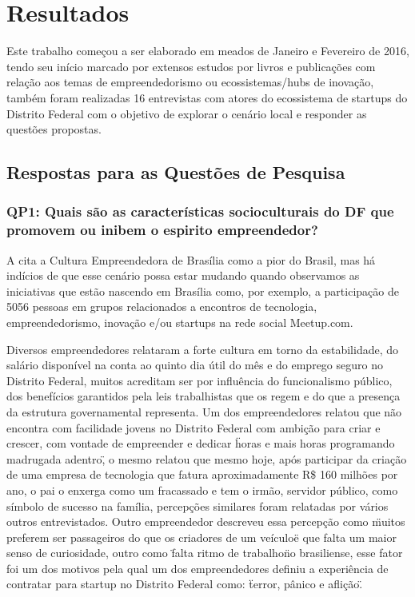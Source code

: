 \chapter[Resultados]{Resultados}
\label{cap-resultados}

Este trabalho começou a ser elaborado em meados de Janeiro e Fevereiro de 2016, tendo seu início marcado por extensos estudos por livros e publicações com relação aos temas de empreendedorismo ou ecossistemas/hubs de inovação, também foram realizadas 16 entrevistas com atores do ecossistema de startups do Distrito Federal com o objetivo de explorar o cenário local e responder as questões propostas.

\section{Respostas para as Questões de Pesquisa}
\label{section:perguntas_de_pesquisa}

\subsection{QP1: Quais são as características socioculturais do DF que promovem ou inibem o espirito empreendedor?}
\label{subsection:pergunta_de_pesquisa_1}

A  cita a Cultura Empreendedora de Brasília como a pior do Brasil, mas há indícios de que esse cenário possa estar mudando quando observamos as iniciativas que estão nascendo em Brasília como, por exemplo, a participação de 5056 pessoas em grupos relacionados a encontros de tecnologia, empreendedorismo, inovação e/ou startups na rede social Meetup.com.

Diversos empreendedores relataram a forte cultura em torno da estabilidade, do salário disponível na conta ao quinto dia útil do mês e do emprego seguro no Distrito Federal, muitos acreditam ser por influência do funcionalismo público, dos benefícios garantidos pela leis trabalhistas que os regem e do que a presença da estrutura governamental representa. Um dos empreendedores relatou que não encontra com facilidade jovens no Distrito Federal com ambição para criar e crescer, com vontade de empreender e dedicar \"horas e mais horas programando madrugada adentro\", o mesmo relatou que mesmo hoje, após participar da criação de uma empresa de tecnologia que fatura aproximadamente R\$ 160 milhões por ano, o pai o enxerga como um fracassado e tem o irmão, servidor público, como símbolo de sucesso na família, percepções similares foram relatadas por vários outros entrevistados. Outro empreendedor descreveu essa percepção como \"muitos preferem ser passageiros do que os criadores de um veículo\" e que falta um maior senso de curiosidade, outro como \"falta ritmo de trabalho\" no brasiliense, esse fator foi um dos motivos pela qual um dos empreendedores definiu a experiência de contratar para startup no Distrito Federal como: \"terror, pânico e aflição\".

